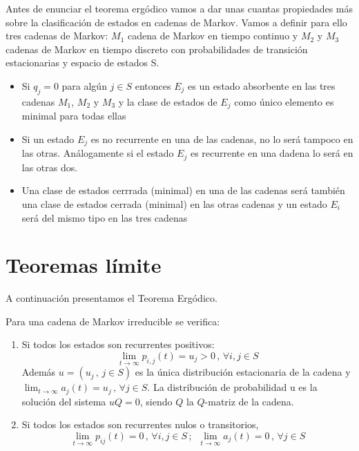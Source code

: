 \documentclass[12pt,a4paper]{article}
\begin{document}
   Antes de enunciar el teorema ergódico vamos a dar unas cuantas propiedades más sobre la clasificación de estados en cadenas de Markov. Vamos a definir para ello tres cadenas de Markov: $M_1$ cadena de Markov en tiempo continuo y $M_2$ y $M_3$ cadenas de Markov en tiempo discreto con probabilidades de transición estacionarias y espacio de estados S.\\
   
   
   \begin{itemize}
   	\item Si $q_j=0$  para algún $j\in S$ entonces $E_j$ es un estado absorbente en las tres cadenas $M_1$, $M_2$ y $M_3$ y la clase de estados de $E_j$ como único elemento es minimal para todas ellas\\
   	
   	\item Si un estado $E_j$ es no recurrente en una de las cadenas, no lo será tampoco en las otras. Análogamente si el estado $E_j$ es recurrente en una dadena lo será en las otras dos.\\
   	
   	\item Una clase de estados cerrrada (minimal) en una de las cadenas será también una clase de estados cerrada (minimal) en las otras cadenas y un estado $E_i$ será del mismo tipo en las tres cadenas
      \end{itemize}
   
\section{Teoremas límite}
A continuación presentamos el Teorema Ergódico.
\begin{theorem}
Para una cadena de Markov irreducible se verifica:
\begin{enumerate}
\item Si todos los estados son recurrentes positivos:
$$\lim_{t\rightarrow\infty}p_{i,j}(t)=u_j>0 \, , \, \forall i,j\in S$$
Además $u=(u_j \, , \, j\in S)$ es la única distribución estacionaria de la cadena y $\displaystyle\lim_{t\rightarrow\infty}a_j (t)=u_j \, , \, \forall j\in S$. La distribución de probabilidad u es la solución del sistema $uQ=0$, siendo $Q$ la $Q$-matriz de la cadena.
\item Si todos los estados son recurrentes nulos o transitorios,
$$\lim_{t\rightarrow\infty}p_{ij}(t)=0\, , \, \forall i,j \in S\, ;\,\,\, \lim_{t\rightarrow\infty}a_j (t)=0\, , \, \forall j\in S$$
\end{enumerate}
\end{theorem}
\end{document}
